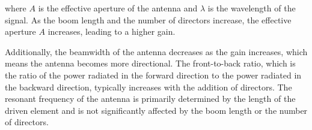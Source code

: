 where \( A \) is the effective aperture of the antenna and \( \lambda \) is the wavelength of the signal. As the boom length and the number of directors increase, the effective aperture \( A \) increases, leading to a higher gain.

Additionally, the beamwidth of the antenna decreases as the gain increases, which means the antenna becomes more directional. The front-to-back ratio, which is the ratio of the power radiated in the forward direction to the power radiated in the backward direction, typically increases with the addition of directors. The resonant frequency of the antenna is primarily determined by the length of the driven element and is not significantly affected by the boom length or the number of directors.

